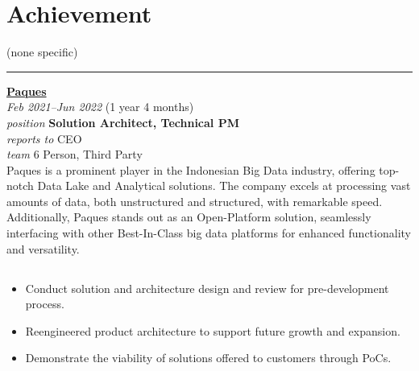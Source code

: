 \documentclass[12pt]{res}
\begin{document}
\begin{resume}
\begin{minipage}[t]{0.42\linewidth}
	\section{Achievement}
	\begin{flushleft}
        \begin{itemize}
		\footnotesize{(none specific)}
        \end{itemize}
	\end{flushleft}
\end{minipage}

\vspace{10pt}
\rule{1.0\textwidth}{0.1pt}

\begin{multicols}{2}
	{\large {\bf \href{https://paques.id}{Paques}}} \\
	{\footnotesize{\sl Feb 2021--Jun 2022} \hfill (1 year 4 months)}\\
	{\footnotesize{\sl position} \hfill \bf{Solution Architect, Technical PM}}\\
	{\footnotesize{\sl reports to} \hfill CEO}\\
	{\footnotesize{\sl team} \hfill 6 Person, Third Party}\\

	\columnbreak
	{\footnotesize{Paques is a prominent player in the Indonesian Big Data industry, offering top-notch Data Lake and Analytical solutions. The company excels at processing vast amounts of data, both unstructured and structured, with remarkable speed. Additionally, Paques stands out as an Open-Platform solution, seamlessly interfacing with other Best-In-Class big data platforms for enhanced functionality and versatility.}}\\
\end{multicols}
\vspace{-20pt}

\begin{multicols}{2}
	\section{}
		\begin{itemize}
			\item Conduct solution and architecture design and review for pre-development process.

\item Reengineered product architecture to support future growth and expansion.

\item Demonstrate the viability of solutions offered to customers through PoCs.


\end{itemize}
\end{multicols}
\end{resume}
\end{document}
